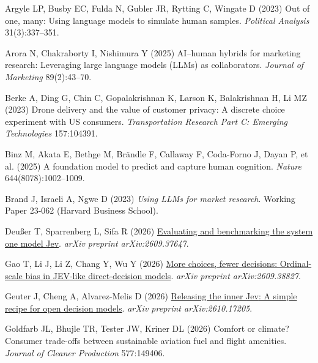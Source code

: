 \documentclass[
  11pt,
  letterpaper,
]{article}
\newlength{\cslhangindent}
\newenvironment{CSLReferences}[2] %
 {\begin{list}{}{%
  \setlength{\itemindent}{0pt}
  \setlength{\leftmargin}{0pt}
  \setlength{\parsep}{0pt}
  \ifodd #1
   \setlength{\leftmargin}{\cslhangindent}
   \setlength{\itemindent}{-1\cslhangindent}
  \fi
  \setlength{\itemsep}{#2\baselineskip}}}
 {\end{list}}
\begin{document}
\protect{}\label{refs}
\begin{CSLReferences}{1}{0}
Argyle LP, Busby EC, Fulda N, Gubler JR, Rytting C, Wingate D (2023) Out
of one, many: Using language models to simulate human samples.
\emph{Political Analysis} 31(3):337--351.

Arora N, Chakraborty I, Nishimura Y (2025) AI--human hybrids for
marketing research: Leveraging large language models (LLMs) as
collaborators. \emph{Journal of Marketing} 89(2):43--70.

Berke A, Ding G, Chin C, Gopalakrishnan K, Larson K, Balakrishnan H, Li
MZ (2023) Drone delivery and the value of customer privacy: A discrete
choice experiment with US consumers. \emph{Transportation Research Part
C: Emerging Technologies} 157:104391.

{Binz M, Akata E, Bethge M, Brändle F, Callaway F, Coda-Forno J, Dayan
P, et al.} (2025) A foundation model to predict and capture human
cognition. \emph{Nature} 644(8078):1002--1009.

Brand J, Israeli A, Ngwe D (2023) \emph{Using {LLMs} for market
research}. Working Paper 23-062 (Harvard Business School).

Deußer T, Sparrenberg L, Sifa R (2026)
\href{https://arxiv.org/abs/2609.37647}{Evaluating and benchmarking the
system one model {Jev}}. \emph{arXiv preprint arXiv:2609.37647}.

Gao T, Li J, Li Z, Chang Y, Wu Y (2026)
\href{https://arxiv.org/abs/2609.38827}{More choices, fewer decisions:
Ordinal-scale bias in {JEV}-like direct-decision models}. \emph{arXiv
preprint arXiv:2609.38827}.

Geuter J, Cheng A, Alvarez-Melis D (2026)
\href{https://arxiv.org/abs/2610.17205}{Releasing the inner {Jev}: A
simple recipe for open decision models}. \emph{arXiv preprint
arXiv:2610.17205}.

Goldfarb JL, Bhujle TR, Tester JW, Kriner DL (2026) Comfort or climate?
Consumer trade-offs between sustainable aviation fuel and flight
amenities. \emph{Journal of Cleaner Production} 577:149406.


\end{CSLReferences}
\end{document}
